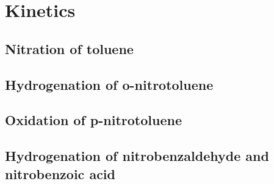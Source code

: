 \section{Kinetics}
\subsection{Nitration of toluene}
\subsection{Hydrogenation of o-nitrotoluene}

\subsection{Oxidation of p-nitrotoluene}
\subsection{Hydrogenation of nitrobenzaldehyde and nitrobenzoic acid}